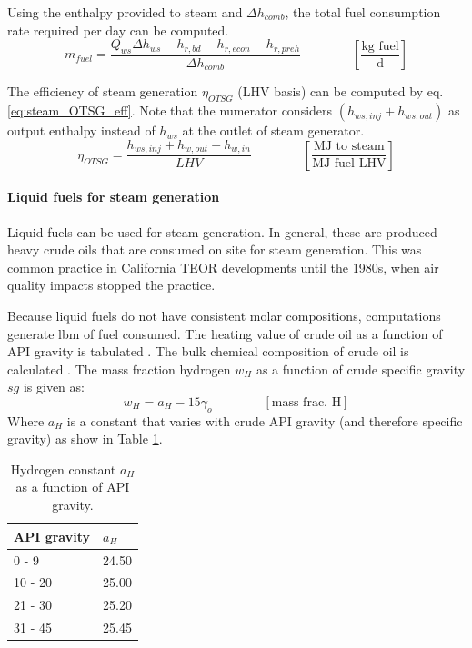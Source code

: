 \documentclass[11pt]{report}
\newcommand{\eqnunit}[1]{\quad\quad \scriptstyle{\left[\text{#1}\right]}}
\newcommand{\eqnunitfrac}[2]{\quad\quad \scriptstyle{\left[\frac{\text{#1}}{\text{#2}}\right]}}
\begin{document}
Using the enthalpy provided to steam and $\Delta h_{comb}$, the total fuel consumption rate required per day can be computed.
\begin{equation}\label{eq:steam_mfuel}
m_{fuel} = \frac{Q_{ws} \Delta h_{ws} - h_{r,bd} - h_{r,econ} - h_{r,preh}}{\Delta h_{comb}} \quad\quad\eqnunitfrac{kg fuel}{d}
\end{equation}

The efficiency of steam generation $\eta_{OTSG}$ (LHV basis) can be computed by eq.\eqref{eq:steam_OTSG_eff}. Note that the numerator considers $(h_{ws,inj}+h_{ws,out})$ as output enthalpy instead of $h_{ws}$ at the outlet of steam generator.
\begin{equation}\label{eq:steam_OTSG_eff}
\eta_{OTSG} = \frac{h_{ws,inj} + h_{w,out} - h_{w,in}}{LHV} \quad\quad\eqnunitfrac{MJ to steam}{MJ fuel LHV}
\end{equation}


\paragraph{Liquid fuels for steam generation}
Liquid fuels can be used for steam generation. In general, these are produced heavy crude oils that are consumed on site for steam generation. This was common practice in California TEOR developments until the 1980s, when air quality impacts stopped the practice.

Because liquid fuels do not have consistent molar compositions, computations generate lbm of fuel consumed. The heating value of crude oil as a function of API gravity is tabulated \cite{Schmidt1985}. The bulk chemical composition of crude oil is calculated \cite[p. 41]{Schmidt1985}. The mass fraction hydrogen $w_H$ as a function of crude specific gravity $sg$ is given as:
\begin{equation}\label{eq:steam_wh}
w_H = a_H - 15 \gamma_o \quad\quad\eqnunit{mass frac. H}
\end{equation}
Where $a_H$ is a constant that varies with crude API gravity (and therefore specific gravity) as show in Table \ref{tab:hydrogen_const}.

\begin{table}
\caption{Hydrogen constant $a_H$ as a function of API gravity.}
\label{tab:hydrogen_const}
\begin{scriptsize}
\begin{tabular*}{0.5\columnwidth}{p{}p{}}
\toprule
API gravity & $a_H$ \\
\midrule
0 - 9 & 24.50\\
10 - 20 & 25.00\\
21 - 30 & 25.20 \\
31 - 45 & 25.45 \\
\bottomrule
\end{tabular*}
\end{scriptsize}
\end{table}
\end{document}
